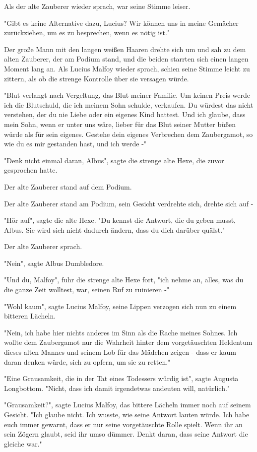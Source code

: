{Als der alte Zauberer wieder sprach, war seine Stimme leiser.

"Gibt es keine Alternative dazu, Lucius? Wir können uns in meine Gemächer zurückziehen, um es zu besprechen, wenn es nötig ist."

Der große Mann mit den langen weißen Haaren drehte sich um und sah zu dem alten Zauberer, der am Podium stand, und die beiden starrten sich einen langen Moment lang an. Als Lucius Malfoy wieder sprach, schien seine Stimme leicht zu zittern, als ob die strenge Kontrolle über sie versagen würde.

"Blut verlangt nach Vergeltung, das Blut meiner Familie. Um keinen Preis werde ich die Blutschuld, die ich meinem Sohn schulde, verkaufen. Du würdest das nicht verstehen, der du nie Liebe oder ein eigenes Kind hattest. Und ich glaube, dass mein Sohn, wenn er unter uns wäre, lieber für das Blut seiner Mutter büßen würde als für sein eigenes. Gestehe dein eigenes Verbrechen dem Zaubergamot, so wie du es mir gestanden hast, und ich werde -"

"Denk nicht einmal daran, Albus", sagte die strenge alte Hexe, die zuvor gesprochen hatte.

Der alte Zauberer stand auf dem Podium.

Der alte Zauberer stand am Podium, sein Gesicht verdrehte sich, drehte sich auf -

"Hör auf", sagte die alte Hexe. "Du kennst die Antwort, die du geben musst, Albus. Sie wird sich nicht dadurch ändern, dass du dich darüber quälst."

Der alte Zauberer sprach.

"Nein", sagte Albus Dumbledore.

"Und du, Malfoy", fuhr die strenge alte Hexe fort, "ich nehme an, alles, was du die ganze Zeit wolltest, war, seinen Ruf zu ruinieren -"

"Wohl kaum", sagte Lucius Malfoy, seine Lippen verzogen sich nun zu einem bitteren Lächeln.

"Nein, ich habe hier nichts anderes im Sinn als die Rache meines Sohnes. Ich wollte dem Zaubergamot nur die Wahrheit hinter dem vorgetäuschten Heldentum dieses alten Mannes und seinem Lob für das Mädchen zeigen - dass er kaum daran denken würde, sich zu opfern, um sie zu retten."

"Eine Grausamkeit, die in der Tat eines Todessers würdig ist", sagte Augusta Longbottom. "Nicht, dass ich damit irgendetwas andeuten will, natürlich."

"Grausamkeit?", sagte Lucius Malfoy, das bittere Lächeln immer noch auf seinem Gesicht. "Ich glaube nicht. Ich wusste, wie seine Antwort lauten würde. Ich habe euch immer gewarnt, dass er nur seine vorgetäuschte Rolle spielt. Wenn ihr an sein Zögern glaubt, seid ihr umso dümmer. Denkt daran, dass seine Antwort die gleiche war."

}
